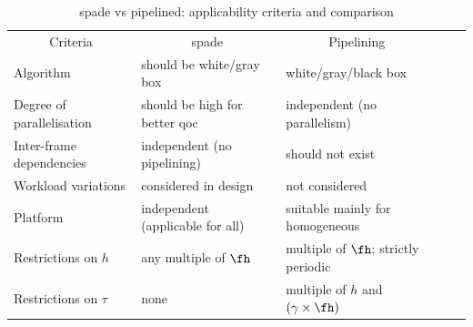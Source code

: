 \begin{table}
\scriptsize
\caption{\gls{spade} vs pipelined: applicability criteria and comparison}
\label{table:comparison}
\vspace{-1em}
\centering
\begin{tabular}{|l|l|l|ll}
\cline{1-3}
\multicolumn{1}{|c|}{Criteria} & \multicolumn{1}{c|}{\gls{spade}}         & \multicolumn{1}{c|}{Pipelining~\cite{medina2019designing}} &  &  \\ \cline{1-3}
Algorithm       & should be white/gray box & white/gray/black box                               &  &  \\ \cline{1-3}
Degree of parallelisation & should be high for better \gls{qoc}                                & independent (no parallelism)  &  &  \\ \cline{1-3}               Inter-frame dependencies  & independent (no pipelining) & should not exist \\ \cline{1-3}
Workload variations                               & considered in design                                   &                   not considered              &  &  \\ \cline{1-3}
Platform                               & independent (applicable for all)                                   &                   suitable mainly for homogeneous              &  &  \\ \cline{1-3}
Restrictions on $h$                                & any multiple of $\fh$                                   &                   multiple of $\fh$; strictly periodic              &  &  \\ \cline{1-3}
Restrictions on $\tau$                                & none                                   &                   multiple of $h$ and $(\gamma\times \fh)$      &  &  \\ \cline{1-3}
\end{tabular}
\end{table}